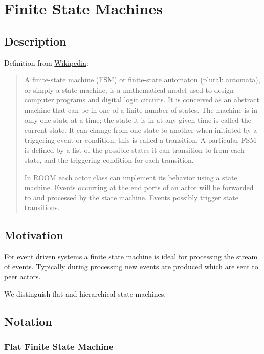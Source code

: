 \section{Finite State Machines}

\subsection{Description}

Definition from \href{http://en.wikipedia.org/wiki/Finite-state\_machine}{Wikipedia}:

\begin{quote}
A finite-state machine (FSM) or finite-state automaton (plural: automata), or simply a state machine, is a 
mathematical model used to design computer programs and digital logic circuits. It is conceived as an 
abstract machine that can be in one of a finite number of states. The machine is in only one state at a 
time; the state it is in at any given time is called the current state. It can change from one state to 
another when initiated by a triggering event or condition, this is called a transition. A particular FSM 
is defined by a list of the possible states it can transition to from each state, and the triggering 
condition for each transition.

In ROOM each actor class can implement its behavior using a state machine. Events occurring at the end 
ports of an actor will be forwarded to and processed by the state machine. Events possibly trigger state 
transitions.
\end{quote}

\subsection{Motivation}

For event driven systems a finite state machine is ideal for processing the stream of events. Typically 
during processing new events are produced which are sent to peer actors.

We distinguish flat and hierarchical state machines.

\subsection{Notation}

\subsubsection{Flat Finite State Machine}

